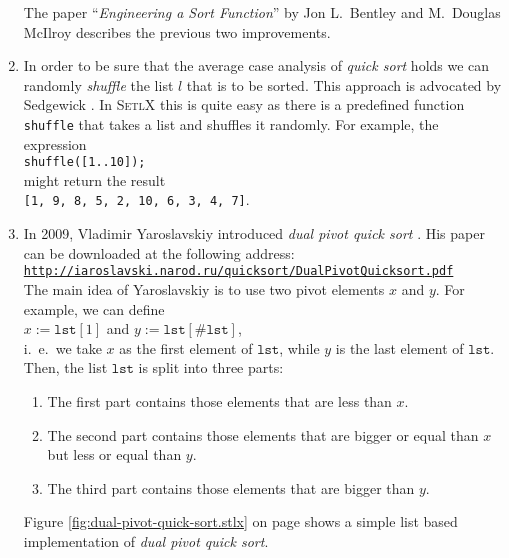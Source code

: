 \begin{enumerate}
      The paper ``\emph{Engineering a Sort Function}'' by Jon L.~Bentley and M.~Douglas McIlroy
      \cite{bentley:93} describes the previous two improvements.
\item In order to be sure that the average case analysis of \emph{quick sort} holds we can randomly
      \emph{shuffle} the list $l$ that is to be sorted.  This approach is advocated by Sedgewick
      \cite{sedgewick:2011}.  In \textsc{SetlX} this is quite easy as
      there is a predefined function \texttt{shuffle} that takes a list and shuffles it randomly.
      For example, the expression
      \\[0.2cm]
      \hspace*{1.3cm}
      \texttt{shuffle([1..10]);}
      \\[0.2cm]
      might return the result
      \\[0.2cm]
      \hspace*{1.3cm}
      \texttt{[1, 9, 8, 5, 2, 10, 6, 3, 4, 7]}.
\item In 2009, Vladimir Yaroslavskiy introduced \emph{dual pivot quick sort} \cite{yaroslavskiy:2009}.  His paper can be
      downloaded at the following address:
      \\[0.2cm]
      \hspace*{0.3cm}
      \href{http://iaroslavski.narod.ru/quicksort/DualPivotQuicksort.pdf}{\texttt{http://iaroslavski.narod.ru/quicksort/DualPivotQuicksort.pdf}}
      \\[0.2cm]
      The main idea of Yaroslavskiy is to use two pivot elements $x$ and $y$.  For example, we can
      define
      \\[0.2cm]
      \hspace*{1.3cm}
      $x := \mathtt{lst}[1]$ \quad and \quad $y := \mathtt{lst}[\#\mathtt{lst}]$,
      \\[0.2cm]
      i.~e.~we take $x$ as the first element of $\mathtt{lst}$, while $y$ is the last element of
      $\mathtt{lst}$.  Then, the list 
      $\mathtt{lst}$ is split into three parts:
      \begin{enumerate}
      \item The first part contains those elements that are less than $x$.
      \item The second part contains those elements that are bigger or equal than $x$ but less or
            equal than $y$.
      \item The third part contains those elements that are bigger than $y$.
      \end{enumerate}
      Figure \ref{fig:dual-pivot-quick-sort.stlx} on page \pageref{fig:dual-pivot-quick-sort.stlx}
      shows a simple list based implementation of \emph{dual pivot quick sort}.




\end{enumerate}
